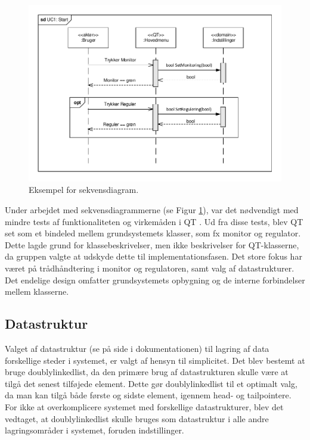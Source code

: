 \begin{figure}[ht]
\centering
\includegraphics[width=\textwidth - 1 cm]{../fig/SD_autoGreen_UC_1_Start.pdf}
\caption{Eksempel for sekvensdiagram.}
\label{fig:sekvens} 
\end{figure}

Under arbejdet med sekvensdiagrammerne (se Figur \ref{fig:sekvens}), var det nødvendigt med mindre tests af funktionaliteten og virkemåden i QT \cite{lib:QT_doc}. Ud fra disse tests, blev QT set som et bindeled mellem grundsystemets klasser, som fx monitor og regulator.
Dette lagde grund for klassebeskrivelser, men ikke beskrivelser for QT-klasserne, da gruppen valgte at udskyde dette til implementationsfasen. Det store fokus har været på trådhåndtering i monitor og regulatoren, samt valg af datastrukturer. 
Det endelige design omfatter grundsystemets opbygning og de interne forbindelser mellem klasserne.

\subsection{Datastruktur}

Valget af datastruktur (se  på side \pageref{P-sec:DoublyLinkedList} i dokumentationen) til lagring af data forskellige steder i systemet, er valgt af hensyn til simplicitet. 
Det blev bestemt at bruge doublylinkedlist, da den primære brug af datastrukturen skulle være at tilgå det senest tilføjede element. 
Dette gør doublylinkedlist til et optimalt valg, da man kan tilgå både første og sidste element, igennem head- og tailpointere. For ikke at overkomplicere systemet med forskellige datastrukturer, blev det vedtaget, at doublylinkedlist skulle bruges som datastruktur i alle andre lagringsområder i systemet, foruden indstillinger. 

